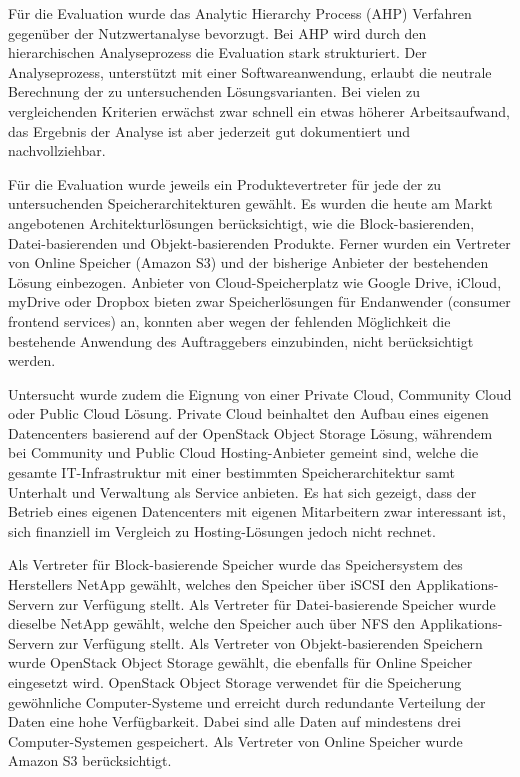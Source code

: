 Für die Evaluation wurde das Analytic Hierarchy Process (AHP) Verfahren gegenüber der Nutzwertanalyse bevorzugt. Bei AHP wird durch den hierarchischen Analyseprozess die Evaluation stark strukturiert. Der Analyseprozess, unterstützt mit einer Softwareanwendung, erlaubt die neutrale Berechnung der zu untersuchenden Lösungsvarianten. Bei vielen zu vergleichenden Kriterien erwächst zwar schnell ein etwas höherer Arbeitsaufwand, das Ergebnis der Analyse ist aber jederzeit gut dokumentiert und nachvollziehbar.

Für die Evaluation wurde jeweils ein Produktevertreter für jede der zu untersuchenden Speicherarchitekturen gewählt. Es wurden die heute am Markt angebotenen Architekturlösungen berücksichtigt, wie die Block-basierenden, Datei-basierenden und Objekt-basierenden Produkte. Ferner wurden ein Vertreter von Online Speicher (Amazon S3) und der bisherige Anbieter der bestehenden Lösung einbezogen. Anbieter von Cloud-Speicherplatz wie Google Drive, iCloud, myDrive oder Dropbox bieten zwar Speicherlösungen für Endanwender (consumer frontend services) an, konnten aber wegen der fehlenden Möglichkeit die bestehende Anwendung des Auftraggebers einzubinden, nicht berücksichtigt werden. 

Untersucht wurde zudem die Eignung von einer Private Cloud, Community Cloud oder Public Cloud Lösung. Private Cloud beinhaltet den Aufbau eines eigenen Datencenters basierend auf der OpenStack Object Storage Lösung, währendem bei Community  und Public Cloud Hosting-Anbieter gemeint sind, welche die gesamte IT-Infrastruktur mit einer bestimmten Speicherarchitektur samt Unterhalt und Verwaltung als Service anbieten. Es hat sich gezeigt, dass der Betrieb eines eigenen Datencenters mit eigenen Mitarbeitern zwar interessant ist, sich finanziell im Vergleich zu Hosting-Lösungen jedoch nicht rechnet.

Als Vertreter für Block-basierende Speicher wurde das Speichersystem des Herstellers NetApp gewählt, welches den Speicher über iSCSI den Applikations-Servern zur Verfügung stellt. Als Vertreter für Datei-basierende Speicher wurde dieselbe NetApp gewählt, welche den Speicher auch über NFS den Applikations-Servern zur Verfügung stellt. Als Vertreter von Objekt-basierenden Speichern wurde OpenStack Object Storage gewählt, die ebenfalls für Online Speicher eingesetzt wird. OpenStack Object Storage verwendet für die Speicherung gewöhnliche Computer-Systeme und erreicht durch redundante Verteilung der Daten eine hohe Verfügbarkeit. Dabei sind alle Daten auf mindestens drei Computer-Systemen gespeichert. Als Vertreter von Online Speicher wurde Amazon S3 berücksichtigt.

